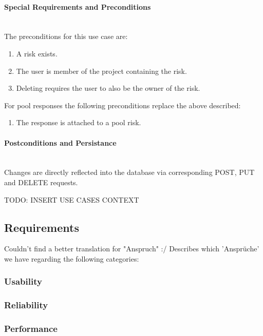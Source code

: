 \paragraph*{Special Requirements and Preconditions}\mbox{}\\
The preconditions for this use case are:
\begin{enumerate}
	\vspace{-3mm}
	\setlength\itemsep{-1em}
	\item  A risk exists.
	\item The user is member of the project containing the risk.
	\item Deleting requires the user to also be the owner of the risk.
\end{enumerate}
For pool responses the following preconditions replace the above described:
\begin{enumerate}
	\vspace{-3mm}
	\setlength\itemsep{-1em}
	\item The response is attached to a pool risk.
\end{enumerate}

\paragraph*{Postconditions and Persistance}\mbox{}\\
Changes are directly reflected into the database via corresponding POST, PUT and DELETE requests.



TODO: INSERT USE CASES CONTEXT

\subsection{Requirements}
\label{sec:domainBc}
Couldn't find a better translation for "Anspruch" :/
Describes which 'Ansprüche' we have regarding the following categories:
\subsubsection{Usability}
\label{sec:domainBca}
\subsubsection{Reliability}
\label{sec:domainBcb}
\subsubsection{Performance}
\label{sec:domainBcc}
